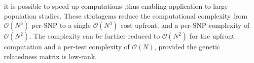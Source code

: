 it is possible to speed up computations \cite{kang2008efficient, kang2010variance, lippert2011fast, zhou2012genome} ,thus enabling application to large population studies. 
These stratagems reduce the computational complexity from $\mathcal{O}(N^3)$
per-SNP to a single  $\mathcal{O}(N^3)$ cost upfront, and a per-SNP complexity of  $\mathcal{O}(N^2)$.
The complexity can be further reduced to $\mathcal{O}(N^2)$ for the upfront computation and a per-test complexity of  $\mathcal{O}(N)$, provided the genetic relatedness matrix is low-rank. 

